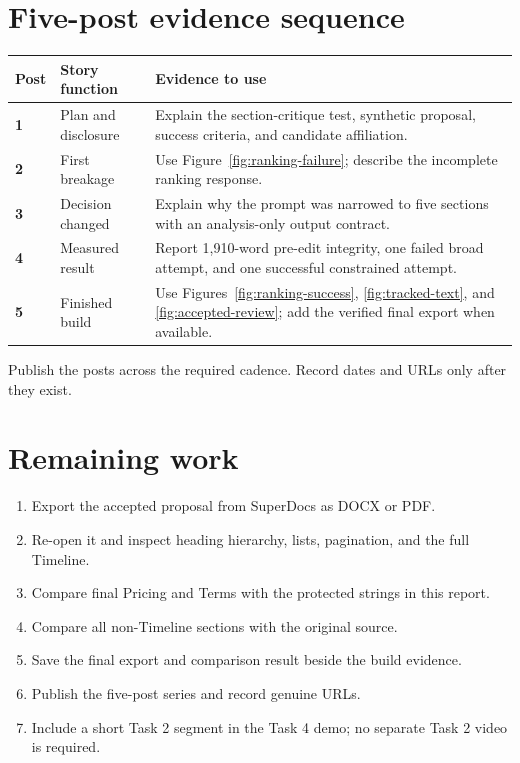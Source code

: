\documentclass[11pt,a4paper]{article}
\begin{document}
\section{Five-post evidence sequence}

\begin{tabularx}{\textwidth}{>{\bfseries}p{} p{} X}
\toprule
Post & Story function & Evidence to use \\
\midrule
1 & Plan and disclosure & Explain the section-critique test, synthetic proposal, success criteria, and candidate affiliation. \\
2 & First breakage & Use Figure~\ref{fig:ranking-failure}; describe the incomplete ranking response. \\
3 & Decision changed & Explain why the prompt was narrowed to five sections with an analysis-only output contract. \\
4 & Measured result & Report 1,910-word pre-edit integrity, one failed broad attempt, and one successful constrained attempt. \\
5 & Finished build & Use Figures~\ref{fig:ranking-success}, \ref{fig:tracked-text}, and \ref{fig:accepted-review}; add the verified final export when available. \\
\bottomrule
\end{tabularx}

Publish the posts across the required cadence. Record dates and URLs only after they exist.

\section{Remaining work}

\begin{enumerate}
  \item Export the accepted proposal from SuperDocs as DOCX or PDF.
  \item Re-open it and inspect heading hierarchy, lists, pagination, and the full Timeline.
  \item Compare final Pricing and Terms with the protected strings in this report.
  \item Compare all non-Timeline sections with the original source.
  \item Save the final export and comparison result beside the build evidence.
  \item Publish the five-post series and record genuine URLs.
  \item Include a short Task 2 segment in the Task 4 demo; no separate Task 2 video is required.
\end{enumerate}
\end{document}
